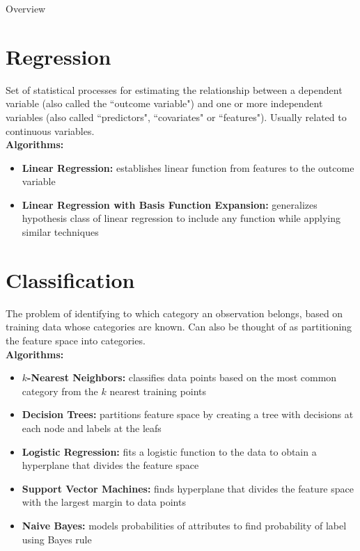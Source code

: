 \documentclass[12pt]{article}
\begin{document}
\begin{center}
		\LARGE{Overview}
\end{center}

\section{Regression}

Set of statistical processes for estimating the relationship between a dependent variable (also called the ``outcome variable") and one or more independent variables (also called ``predictors", ``covariates" or ``features"). Usually related to continuous variables.
\\\newline
\textbf{Algorithms:}
\begin{itemize}
	\item \textbf{Linear Regression:} establishes linear function from features to the outcome variable
	\item \textbf{Linear Regression with Basis Function Expansion:} generalizes hypothesis class of linear regression to include any function while applying similar techniques
\end{itemize}

\section{Classification}

The problem of identifying to which category an observation belongs, based on training data whose categories are known. Can also be thought of as partitioning the feature space into categories.
\\\newline
\textbf{Algorithms:}
\begin{itemize}
	\item \textbf{$k$-Nearest Neighbors:} classifies data points based on the most common category from the $k$ nearest training points
	\item \textbf{Decision Trees:} partitions feature space by creating a tree with decisions at each node and labels at the leafs
	\item \textbf{Logistic Regression:} fits a logistic function to the data to obtain a hyperplane that divides the feature space
	\item \textbf{Support Vector Machines:} finds hyperplane that divides the feature space with the largest margin to data points
	\item \textbf{Naive Bayes:} models probabilities of attributes to find probability of label using Bayes rule
\end{itemize}
\end{document}
